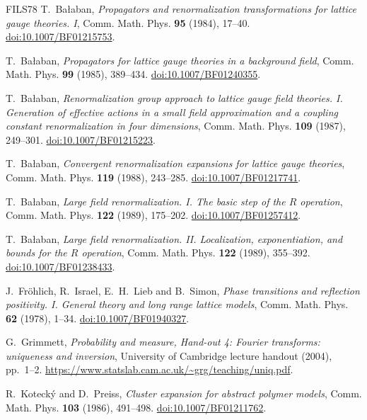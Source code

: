 \documentclass[11pt,letterpaper,reqno]{amsart}
\theoremstyle{definition}
\theoremstyle{remark}
\begin{document}
\begin{thebibliography}{FILS78}
T.~Ba\l aban,
\emph{Propagators and renormalization transformations for lattice gauge
theories. I},
Comm. Math. Phys. \textbf{95} (1984), 17--40.
\href{https://doi.org/10.1007/BF01215753}{doi:10.1007/BF01215753}.

T.~Ba\l aban,
\emph{Propagators for lattice gauge theories in a background field},
Comm. Math. Phys. \textbf{99} (1985), 389--434.
\href{https://doi.org/10.1007/BF01240355}{doi:10.1007/BF01240355}.

T.~Ba\l aban,
\emph{Renormalization group approach to lattice gauge field theories.
I. Generation of effective actions in a small field approximation and
a coupling constant renormalization in four dimensions},
Comm. Math. Phys. \textbf{109} (1987), 249--301.
\href{https://doi.org/10.1007/BF01215223}{doi:10.1007/BF01215223}.

T.~Ba\l aban,
\emph{Convergent renormalization expansions for lattice gauge theories},
Comm. Math. Phys. \textbf{119} (1988), 243--285.
\href{https://doi.org/10.1007/BF01217741}{doi:10.1007/BF01217741}.

T.~Ba\l aban,
\emph{Large field renormalization. I. The basic step of the $R$ operation},
Comm. Math. Phys. \textbf{122} (1989), 175--202.
\href{https://doi.org/10.1007/BF01257412}{doi:10.1007/BF01257412}.

T.~Ba\l aban,
\emph{Large field renormalization. II. Localization, exponentiation,
and bounds for the $R$ operation},
Comm. Math. Phys. \textbf{122} (1989), 355--392.
\href{https://doi.org/10.1007/BF01238433}{doi:10.1007/BF01238433}.

J.~Fr\"ohlich, R.~Israel, E.~H.~Lieb and B.~Simon,
\emph{Phase transitions and reflection positivity.
I. General theory and long range lattice models},
Comm. Math. Phys. \textbf{62} (1978), 1--34.
\href{https://doi.org/10.1007/BF01940327}{doi:10.1007/BF01940327}.

G.~Grimmett,
\emph{Probability and measure, Hand-out 4:
Fourier transforms: uniqueness and inversion},
University of Cambridge lecture handout (2004), pp.~1--2.
\url{https://www.statslab.cam.ac.uk/~grg/teaching/uniq.pdf}.

R.~Koteck\'y and D.~Preiss,
\emph{Cluster expansion for abstract polymer models},
Comm. Math. Phys. \textbf{103} (1986), 491--498.
\href{https://doi.org/10.1007/BF01211762}{doi:10.1007/BF01211762}.


\end{thebibliography}
\end{document}
